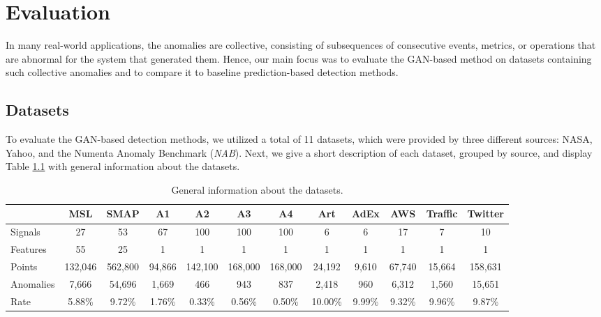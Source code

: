 \chapter{Evaluation}
\label{chap:05-evaluation}

In many real-world applications, the anomalies are collective, consisting of subsequences of consecutive events, metrics, or operations that are abnormal for the system that generated them. Hence, our main focus was to evaluate the GAN-based method on datasets containing such collective anomalies and to compare it to baseline prediction-based detection methods.

\section*{Datasets}
\label{sec:05-datasets}
To evaluate the GAN-based detection methods, we utilized a total of 11 datasets, which were provided by three different sources: NASA, Yahoo, and the Numenta Anomaly Benchmark (\textit{NAB}). Next, we give a short description of each dataset, grouped by source, and display Table \ref{tab:datasets-description} with general information about the datasets.

\begin{table}[H]
\centering
\scriptsize
\begin{tabular}{lccccccccccc}
\toprule
 & MSL & SMAP & A1 & A2 & A3 & A4 & Art & AdEx & AWS & Traffic & Twitter \\
\midrule
Signals        & 27      & 53         & 67      & 100      & 100     & 100       & 6        & 6       & 17      & 7       & 10 \\
Features       & 55      & 25         & 1       & 1        & 1       & 1         & 1        & 1       & 1       & 1       & 1 \\
Points   & 132,046 & 562,800    & 94,866  & 142,100  & 168,000 & 168,000   & 24,192   & 9,610   & 67,740  & 15,664  & 158,631 \\
Anomalies & 7,666   & 54,696     & 1,669   & 466      & 943     & 837       & 2,418    & 960     & 6,312   & 1,560   & 15,651 \\
Rate   & 5.88\%  & 9.72\%     & 1.76\%  & 0.33\%   & 0.56\%  & 0.50\%    & 10.00\%  & 9.99\%  & 9.32\%  & 9.96\%  & 9.87\% \\
\bottomrule
\end{tabular}
\caption{General information about the datasets.}
\label{tab:datasets-description}
\end{table}

